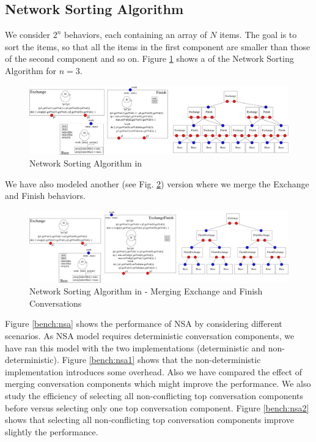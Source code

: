 \subsection{Network Sorting Algorithm}
\label{subsec:nsa}
We consider $2^n$ behaviors, each containing an array of $N$ items. The goal is to sort the items, so that all the items in the first component are smaller than those of the second component and so on. Figure \ref{fig:nsa1} shows a {\compmodel} of the Network Sorting Algorithm for $n=3$.
\begin{figure}
\centering
\includegraphics[scale=0.4]{fig/nsav1.pdf}
\caption{Network Sorting Algorithm in {\compmodel}}\label{fig:nsa1}
\end{figure} 
We have also modeled another (see Fig. \ref{fig:nsa2}) version where we merge the Exchange and Finish behaviors. 

\begin{figure}
\centering
\includegraphics[scale=0.4]{fig/nsav2.pdf}
\caption{Network Sorting Algorithm in {\compmodel} - Merging Exchange and Finish Conversations}\label{fig:nsa2}
\end{figure}


Figure \ref{bench:nsa} shows the performance of NSA by considering different scenarios. As NSA model requires deterministic conversation components, we have ran this model with the two implementations (deterministic and non-deterministic). Figure \ref{bench:nsa1} shows that the non-deterministic implementation introduces some overhead. Also we have compared the effect of merging conversation components which might improve the performance. 
We also study the efficiency of selecting all non-conflicting top conversation components before versus selecting only one top conversation component. Figure \ref{bench:nsa2} shows that selecting all non-conflicting top conversation components improve slightly the performance. 



